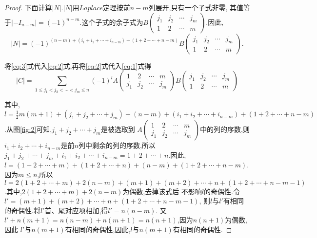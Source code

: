 \begin{proof}
  下面计算$|N|$.$|N|$用$Laplace$定理按前$n-m$列展开,只有一个子式非零,
  其值等于$|-I_{n-m}|=(-1)^{n-m}$.这个子式的余子式为$B\left(\begin{smallmatrix}
      j_1 & j_2 & \cdots & j_m\\
      1 & 2 & \cdots & m \end{smallmatrix}\right)$.因此,
  \begin{equation}\label{eq:3}
    |N| = (-1)^{(n-m)+(i_1+i_2+\cdots+i_{n-m})+(1+2+\cdots+n-m)}%
    B\left(\begin{smallmatrix}
      j_1 & j_2 & \cdots & j_m\\
      1 & 2 & \cdots & m \end{smallmatrix}\right).
  \end{equation}

  将\eqref{eq:3}式代入\eqref{eq:2}式,再将\eqref{eq:2}式代入\eqref{eq:1}式得
\begin{equation}\label{eq:4}
  |C|=\sum\limits_{1\le j_1<j_2<\cdots<j_m\le n}
  (-1)^{l}
  A\left(\begin{smallmatrix}
      1 & 2 & \cdots & m \\
      j_1 & j_2 & \cdots & j_m \end{smallmatrix}\right)
  B\left(\begin{smallmatrix}
      j_1 & j_2 & \cdots & j_m\\
      1 & 2 & \cdots & m \end{smallmatrix}\right)
\end{equation}

其中,$l=\frac{1}{2}m(m+1)+(j_1+j_2+\cdots+j_m)+(n-m)+(i_1+i_2+\cdots+i_{n-m})+
(1+2+\cdots+n-m)$.从图\eqref{fig:2}可知,$j_1+j_2+\cdots+j_m$是被选取到
$A\left(\begin{smallmatrix}
      1 & 2 & \cdots & m \\
      j_1 & j_2 & \cdots & j_m \end{smallmatrix}\right)$中的列的序数,则
  $i_1+i_2+\cdots+i_{n-m}$是前$n$列中剩余的列的序数,所以
  $j_1+j_2+\cdots+j_m+i_1+i_2+\cdots+i_{n-m}=1+2+\cdots+n$.因此,
  $l=(1+2+\cdots+m)+(1+2+\cdots+n)+(n-m)+(1+2+\cdots+n-m)$.
  因为$m \le n$,所以$l=2(1+2+\cdots+m)+2(n-m)+(m+1)+(m+2)+\cdots+n+
  (1+2+\cdots+n-m-1)$.其中,$2(1+2+\cdots+m)+2(n-m)$为偶数,去掉该式后
  不影响$l$的奇偶性.令$l'=(m+1)+(m+2)+\cdots+n+(1+2+\cdots+n-m-1)$,
  则$l$与$l'$有相同的奇偶性.将$l'$首、尾对应项相加,得$l'=n(n-m)$.
  又$l'+n(m+1)=n(n-m)+n(m+1)=n(n+1)$,因为$n(n+1)$为偶数,因此
  $l'$与$n(m+1)$有相同的奇偶性,因此,$l$与$n(m+1)$有相同的奇偶性.


\end{proof}
